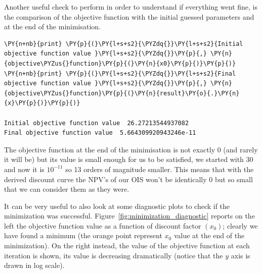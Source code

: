 Another useful check to perform in order to understand if everything went fine, is the comparison of the objective function with the initial guessed parameters and at the end of the minimisation.

\begin{codebox}
\begin{Verbatim}[commandchars=\\\{\}]
\PY{n+nb}{print} \PY{p}{(}\PY{l+s+s2}{\PYZdq{}}\PY{l+s+s2}{Initial objective function value }\PY{l+s+s2}{\PYZdq{}}\PY{p}{,} \PY{n}{objective\PYZus{}function}\PY{p}{(}\PY{n}{x0}\PY{p}{)}\PY{p}{)}
\PY{n+nb}{print} \PY{p}{(}\PY{l+s+s2}{\PYZdq{}}\PY{l+s+s2}{Final objective function value }\PY{l+s+s2}{\PYZdq{}}\PY{p}{,} \PY{n}{objective\PYZus{}function}\PY{p}{(}\PY{n}{result}\PY{o}{.}\PY{n}{x}\PY{p}{)}\PY{p}{)}
	
Initial objective function value  26.27213544937082
Final objective function value  5.664309920943246e-11
\end{Verbatim}
\end{codebox}
The objective function at the end of the minimisation is not exactly 0 (and rarely it will be) but its value is small enough for us to be satisfied, we started with $30$ and now it is $10^{-11}$ so 13 orders of magnitude smaller. This means that with the derived discount curve the NPV's of our OIS won't be identically 0 but so small that we can consider them as they were.

It can be very useful to also look at some diagnostic plots to check if the minimization was successful. Figure~\ref{fig:minimization_diagnostic} reports on the left the objective function value as a function of discount factor $(x_0)$; clearly we have found a minimum (the orange point represent $x_0$ value at the end of the minimization). On the right instead, the value of the objective function at each iteration is shown, its value is decreasing dramatically (notice that the $y$ axis is drawn in log scale).

